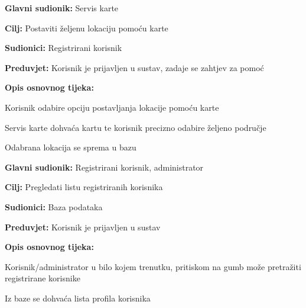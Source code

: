 \noindent {}
\begin{packed_item}
	
	\item \textbf{Glavni sudionik: } Servis karte
	\item  \textbf{Cilj:} Postaviti željenu lokaciju pomoću karte
	\item  \textbf{Sudionici:} Registrirani korisnik
	\item  \textbf{Preduvjet:} Korisnik je prijavljen u sustav, zadaje se zahtjev za pomoć
	\item  \textbf{Opis osnovnog tijeka:}
	
	\item[] \begin{packed_enum}
		
		\item Korisnik odabire opciju postavljanja lokacije pomoću karte
		\item Servis karte dohvaća kartu te korisnik precizno odabire željeno područje
		\item Odabrana lokacija se sprema u bazu
	\end{packed_enum}
\end{packed_item}
\noindent {}
\begin{packed_item}
	
	\item \textbf{Glavni sudionik: }Registrirani korisnik, administrator
	\item  \textbf{Cilj:} Pregledati listu registriranih korisnika
	\item  \textbf{Sudionici:} Baza podataka
	\item  \textbf{Preduvjet:} Korisnik je prijavljen u sustav
	\item  \textbf{Opis osnovnog tijeka:}
	
	\item[] \begin{packed_enum}
		
		\item Korisnik/administrator u bilo kojem trenutku, pritiskom na gumb može pretražiti registrirane korisnike
		\item Iz baze se dohvaća lista profila korisnika
	\end{packed_enum}
\end{packed_item}
\noindent {}

